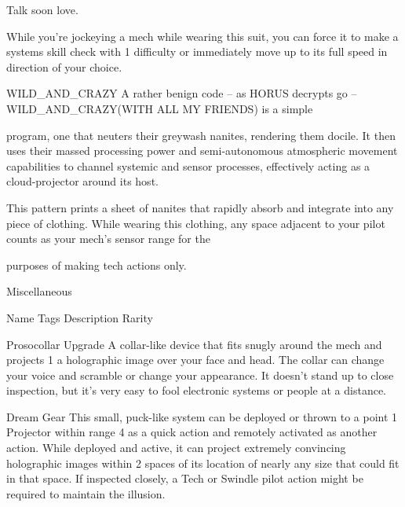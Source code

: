 Talk soon love.   

While you’re jockeying a mech while wearing this suit, you can force it to make a systems skill check with  
1 difficulty or immediately move up to its full speed in direction of your choice.
 

WILD\_AND\_CRAZY  
A rather benign code -- as HORUS decrypts go -- WILD\_AND\_CRAZY(WITH ALL MY FRIENDS) is a simple  

program, one that neuters their greywash nanites, rendering them docile. It then uses their massed  
processing power and semi-autonomous atmospheric movement capabilities to channel systemic and  
sensor processes, effectively acting as a cloud-projector around its host.   

This pattern prints a sheet of nanites that rapidly absorb and integrate into any piece of clothing. While  
wearing this clothing, any space adjacent to your pilot counts as your mech’s sensor range for the  

purposes of making tech actions only. 
 

                                                 Miscellaneous 

 Name                Tags        Description                                                               Rarity 

 Prosocollar         Upgrade     A collar-like device that fits snugly around the mech and projects         1 
                                 a holographic image over your face and head. The collar can  
                                 change your voice and scramble or change your appearance. It  
                                 doesn’t stand up to close inspection, but it’s very easy to fool  
                                 electronic systems or people at a distance. 

                                                                                                               


Dream                 Gear         This small, puck-like system can be deployed or thrown to a point                 1 
Projector                          within range 4 as a quick action and remotely activated as another  
                                   action. While deployed and active, it can project extremely  
                                   convincing holographic images within 2 spaces of its location of  
                                   nearly any size that could fit in that space. If inspected closely, a  
                                   Tech or Swindle pilot action might be required to maintain the  
                                   illusion. 

